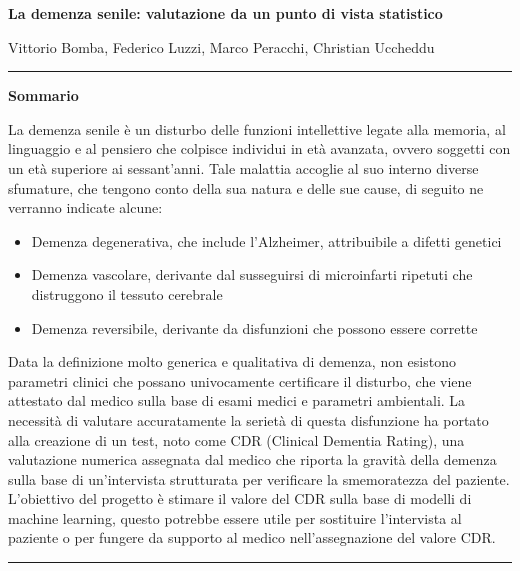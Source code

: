 \documentclass[10pt, a4paper,openany]{article}
\begin{document}
\begin{center}
\textbf{{La demenza senile: valutazione da un punto di vista statistico}}
\end{center}

\begin{center}
Vittorio Bomba, Federico Luzzi,  Marco Peracchi, Christian Uccheddu
\end{center}

\hrule
\vspace{0.3cm}

\begin{center}\textbf{{Sommario}}
\end{center}

La demenza senile è un disturbo delle funzioni intellettive legate alla memoria, al linguaggio e al pensiero che colpisce individui in età avanzata, ovvero soggetti con un età superiore ai sessant'anni. Tale malattia accoglie al suo interno diverse sfumature, che tengono conto della sua natura e delle sue cause, di seguito ne verranno indicate alcune:
\begin{itemize}
    \item Demenza degenerativa, che include l'Alzheimer, attribuibile a difetti genetici
    \item Demenza vascolare, derivante dal susseguirsi di microinfarti ripetuti che distruggono il tessuto cerebrale
    \item Demenza reversibile, derivante da disfunzioni che possono essere corrette
\end{itemize}
Data la definizione molto generica e qualitativa di demenza, non esistono parametri clinici che possano univocamente certificare il disturbo, che viene attestato dal medico sulla base di esami medici e parametri ambientali. La necessità di valutare accuratamente la serietà di questa  disfunzione ha portato alla creazione di un test, noto come CDR (Clinical Dementia Rating), una valutazione numerica assegnata dal medico che riporta la gravità della demenza sulla base di un'intervista strutturata per verificare la smemoratezza del paziente. \\
L'obiettivo del progetto è stimare il valore del CDR sulla base di modelli di machine learning, questo potrebbe essere utile per sostituire l'intervista al paziente o per fungere da supporto al medico nell'assegnazione del valore CDR. 
\vspace{0.3cm}
\hrule
\end{document}
